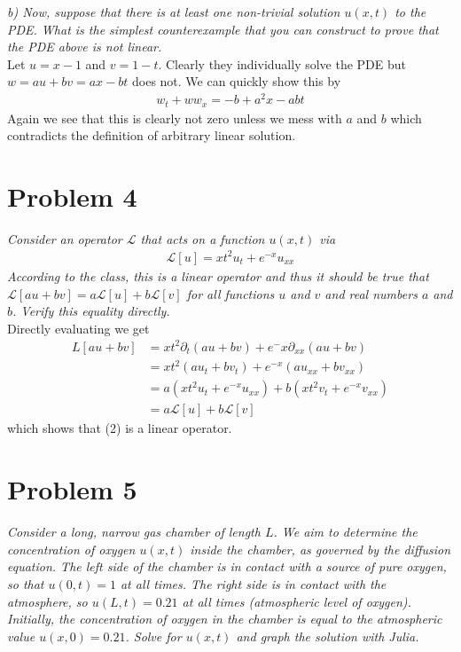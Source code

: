 \documentclass[12pt]{article}
\theoremstyle{remark}
\begin{document}
\textit{b) Now, suppose that there is at least one non-trivial solution $u(x,t)$ to the PDE. What is the simplest counterexample that you can construct to prove that the PDE above is not linear.} \\ 

Let $u = x - 1$ and $v = 1-t$. Clearly they individually solve the PDE but $w = au + bv = ax - bt$ does not. We can quickly show this by
\begin{align*}
	w_t + ww_x = -b + a^2x - abt 
\end{align*}
Again we see that this is clearly not zero unless we mess with $a$ and $b$ which contradicts the definition of arbitrary linear solution. 

\pagebreak

\section*{Problem 4}

\textit{Consider an operator $\mathcal{L}$ that acts on a function $u(x,t)$ via}
\begin{align}
	\mathcal{L}[u] = xt^2u_t + e^{-x}u_{xx}
\end{align}
\textit{According to the class, this is a linear operator and thus it should be true that $\mathcal{L}[au+bv] = a\mathcal{L}[u] + b\mathcal{L}[v]$ for all functions $u$ and $v$ and real numbers $a$ and $b$. Verify this equality directly.} \\ 

Directly evaluating we get
\begin{align*}
	{L}[au+bv] & = xt^2\partial_t(au + bv) + e^-x\partial_{xx}(au + bv) \\
	& = xt^2(au_t + bv_t) + e^{-x}(au_{xx} + bv_{xx}) \\
	& = a(xt^2u_t + e^{-x}u_{xx}) + b(xt^2v_t + e^{-x}v_{xx}) \\
	& = a\mathcal{L}[u] + b\mathcal{L}[v]
\end{align*}
which shows that (2) is a linear operator.

\pagebreak

\section*{Problem 5}

\textit{Consider a long, narrow gas chamber of length $L$. We aim to determine the concentration of oxygen $u(x,t)$ inside the chamber, as governed by the diffusion equation. The left side of the chamber is in contact with a source of pure oxygen, so that $u(0,t) = 1$ at all times. The right side is in contact with the atmosphere, so $u(L,t) = 0.21$ at all times (atmospheric level of oxygen). Initially, the concentration of oxygen in the chamber is equal to the atmospheric value $u(x,0) = 0.21$. Solve for $u(x,t)$ and graph the solution with Julia.} \\ 
\end{document}
